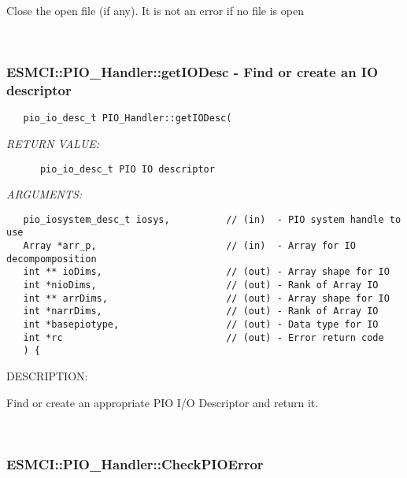       Close the open file (if any).
      It is not an error if no file is open
   
 
\mbox{}\hrulefill\
 
\subsubsection [ESMCI::PIO\_Handler::getIODesc] {ESMCI::PIO\_Handler::getIODesc - Find or create an IO descriptor}


  
\begin{verbatim}   pio_io_desc_t PIO_Handler::getIODesc(\end{verbatim}{\em RETURN VALUE:}
\begin{verbatim}      pio_io_desc_t PIO IO descriptor\end{verbatim}{\em ARGUMENTS:}
\begin{verbatim}   pio_iosystem_desc_t iosys,          // (in)  - PIO system handle to use
   Array *arr_p,                       // (in)  - Array for IO decompomposition
   int ** ioDims,                      // (out) - Array shape for IO
   int *nioDims,                       // (out) - Rank of Array IO
   int ** arrDims,                     // (out) - Array shape for IO
   int *narrDims,                      // (out) - Rank of Array IO
   int *basepiotype,                   // (out) - Data type for IO
   int *rc                             // (out) - Error return code
   ) {\end{verbatim}
{\sf DESCRIPTION:\\ }


      Find or create an appropriate PIO I/O Descriptor and return it.
   
 
\mbox{}\hrulefill\
 
\subsubsection [ESMCI::PIO\_Handler::CheckPIOError] {ESMCI::PIO\_Handler::CheckPIOError}



